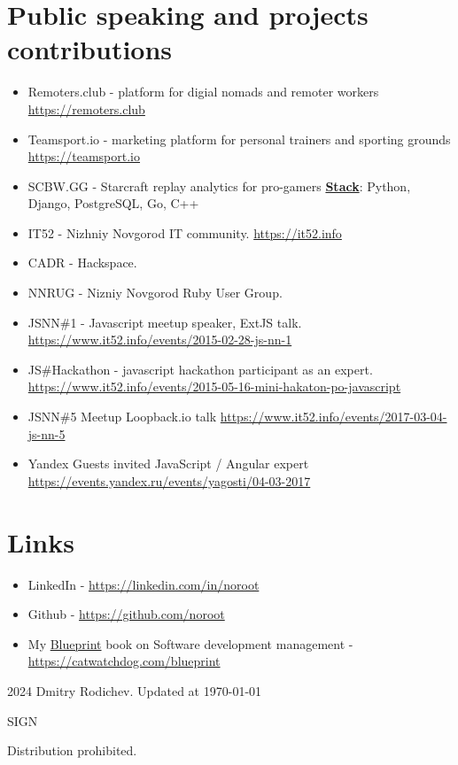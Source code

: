 \documentclass[9pt]{extarticle}
\newcommand\hr{\par\vspace{-.5\ht\strutbox}\noindent\hrulefill\par}
\begin{document}
\section{Public speaking and projects contributions}
\begin{itemize}
  \item{Remoters.club - platform for digial nomads and remoter workers \href{https://remoters.club}{https://remoters.club}}
  \item{Teamsport.io - marketing platform for personal trainers and sporting grounds \href{https://teamsport.io}{https://teamsport.io}}
  \item{SCBW.GG - Starcraft replay analytics for pro-gamers \href{https://scbw.gg}
        \textbf{Stack}: Python, Django, PostgreSQL, Go, C++}

  \item{IT52 - Nizhniy Novgorod IT community}. \href{https://it52.info}{https://it52.info}
  \item{CADR - Hackspace}.
  \item{NNRUG - Nizniy Novgorod Ruby User Group. }
  \item{JSNN\#1 - Javascript meetup speaker, ExtJS talk. \href{https://www.it52.info/events/2015-02-28-js-nn-1}{https://www.it52.info/events/2015-02-28-js-nn-1}
        }
  \item{JS\#Hackathon - javascript hackathon participant as an expert. \href{https://www.it52.info/events/2015-05-16-mini-hakaton-po-javascript}{https://www.it52.info/events/2015-05-16-mini-hakaton-po-javascript} }
  \item{ JSNN\#5 Meetup Loopback.io talk \href{https://www.it52.info/events/2017-03-04-js-nn-5}{https://www.it52.info/events/2017-03-04-js-nn-5}}
  \item{ Yandex Guests invited JavaScript / Angular expert \href{https://events.yandex.ru/events/yagosti/04-03-2017}{https://events.yandex.ru/events/yagosti/04-03-2017}
  }
\end{itemize}
\section{Links}
\begin{itemize}
  \item{LinkedIn - \href{https://linkedin.com/in/noroot}{https://linkedin.com/in/noroot}}
  \item{Github - \href{https://github.com/noroot/}{https://github.com/noroot}}
  \item{My \href{https://catwatchdog.com/blueprint}{Blueprint} book on Software development management - \href{https://catwatchdog.com/blueprint}{https://catwatchdog.com/blueprint}}
\end{itemize}

\vspace{0.5em}
\hr
2024 \textcopyright\space Dmitry Rodichev. Updated at \today

\vspace{0.5em}
SIGN
\vspace{0.5em}

Distribution prohibited. 
\end{document}

